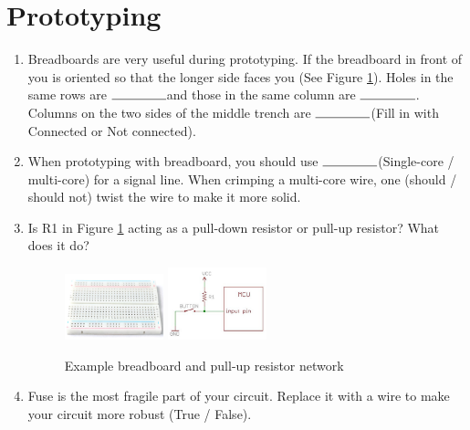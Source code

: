 \documentclass{article}
\newcommand{\ans}{$\rule{1.5cm}{0.15mm}$}
\begin{document}
\section{Prototyping}
\begin{enumerate}
	\item Breadboards are very useful during prototyping. If the breadboard in front of you is oriented so that the longer side faces you (See Figure \ref{fig:bread}). Holes in the same rows are \ans and those in the same column are \ans. Columns on the two sides of the middle trench are \ans (Fill in with Connected or Not connected). 
	\item When prototyping with breadboard, you should use \ans (Single-core / multi-core) for a signal line. When crimping a multi-core wire, one (should / should not) twist the wire to make it more solid. 
	\item Is R1 in Figure \ref{fig:bread} acting as a pull-down resistor or pull-up resistor? What does it do?
	\begin{figure}[h]
		\center
		\includegraphics[width=0.27\textwidth, keepaspectratio]{bread}
		\includegraphics[width=0.27\textwidth, keepaspectratio]{pull}
		\caption{Example breadboard and pull-up resistor network}
		\label{fig:bread}
	\end{figure}
	\item Fuse is the most fragile part of your circuit. Replace it with a wire to make your circuit more robust (True / False).
\end{enumerate}
\end{document}
